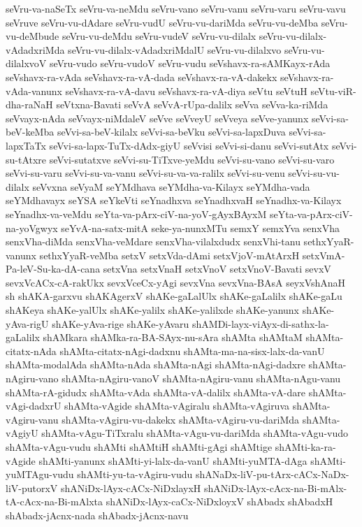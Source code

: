 {seVru-va-naSeTx
seVru-va-neMdu
seVru-vano
seVru-vanu
seVru-varu
seVru-vavu
seVruve
seVru-vu-dAdare
seVru-vudU
seVru-vu-dariMda
seVru-vu-deMba
seVru-vu-deMbude
seVru-vu-deMdu
seVru-vudeV
seVru-vu-dilalx
seVru-vu-dilalx-vAdadxriMda
seVru-vu-dilalx-vAdadxriMdalU
seVru-vu-dilalxvo
seVru-vu-dilalxvoV
seVru-vudo
seVru-vudoV
seVru-vudu
seVshavx-ra-sAMKayx-rAda
seVshavx-ra-vAda
seVshavx-ra-vA-dada
seVshavx-ra-vA-dakekx
seVshavx-ra-vAda-vanunx
seVshavx-ra-vA-davu
seVshavx-ra-vA-diya
seVtu
seVtuH
seVtu-viR-dha-raNaH
seVtxna-Bavati
seVvA
seVvA-rUpa-dalilx
seVva
seVva-ka-riMda
seVvayx-nAda
seVvayx-niMdaleV
seVve
seVveyU
seVveya
seVve-yanunx
seVvi-sa-beV-keMba
seVvi-sa-beV-kilalx
seVvi-sa-beVku
seVvi-sa-lapxDuva
seVvi-sa-lapxTaTx
seVvi-sa-lapx-TuTx-dAdx-giyU
seVvisi
seVvi-si-danu
seVvi-sutAtx
seVvi-su-tAtxre
seVvi-sutatxve
seVvi-su-TiTxve-yeMdu
seVvi-su-vano
seVvi-su-varo
seVvi-su-varu
seVvi-su-va-vanu
seVvi-su-va-va-ralilx
seVvi-su-venu
seVvi-su-vu-dilalx
seVvxna
seVyaM
seYMdhava
seYMdha-va-Kilayx
seYMdha-vada
seYMdhavayx
seYSA
seYkeVti
seYnadhxva
seYnadhxvaH
seYnadhx-va-Kilayx
seYnadhx-va-veMdu
seYta-va-pArx-ciV-na-yoV-gAyxBAyxM
seYta-va-pArx-ciV-na-yoVgwyx
seYvA-na-satx-mitA
seke-ya-nunxMTu
semxY
semxYva
senxVha
senxVha-diMda
senxVha-veMdare
senxVha-vilalxdudx
senxVhi-tanu
sethxYyaR-vanunx
sethxYyaR-veMba
setxV
setxVda-dAmi
setxVjoV-mAtArxH
setxVmA-Pa-leV-Su-ka-dA-cana
setxVna
setxVnaH
setxVnoV
setxVnoV-Bavati
sevxV
sevxVcACx-cA-rakUkx
sevxVceCx-yAgi
sevxVna
sevxVna-BAsA
seyxVshAnaH
sh
shAKA-garxvu
shAKAgerxV
shAKe-gaLalUlx
shAKe-gaLalilx
shAKe-gaLu
shAKeya
shAKe-yalUlx
shAKe-yalilx
shAKe-yalilxde
shAKe-yanunx
shAKe-yAva-rigU
shAKe-yAva-rige
shAKe-yAvaru
shAMDi-layx-viAyx-di-sathx-la-gaLalilx
shAMkara
shAMka-ra-BA-SAyx-nu-sAra
shAMta
shAMtaM
shAMta-citatx-nAda
shAMta-citatx-nAgi-dadxnu
shAMta-ma-na-sisx-lalx-da-vanU
shAMta-modalAda
shAMta-nAda
shAMta-nAgi
shAMta-nAgi-dadxre
shAMta-nAgiru-vano
shAMta-nAgiru-vanoV
shAMta-nAgiru-vanu
shAMta-nAgu-vanu
shAMta-rA-gidudx
shAMta-vAda
shAMta-vA-dalilx
shAMta-vA-dare
shAMta-vAgi-dadxrU
shAMta-vAgide
shAMta-vAgiralu
shAMta-vAgiruva
shAMta-vAgiru-vanu
shAMta-vAgiru-vu-dakekx
shAMta-vAgiru-vu-dariMda
shAMta-vAgiyU
shAMta-vAgu-TiTxralu
shAMta-vAgu-vu-dariMda
shAMta-vAgu-vudo
shAMta-vAgu-vudu
shAMti
shAMtiH
shAMti-gAgi
shAMtige
shAMti-ka-ra-vAgide
shAMti-yanunx
shAMti-yi-lalx-da-vanU
shAMti-yuMTA-dAga
shAMti-yuMTAgu-vudu
shAMti-yu-ta-vAgiru-vudu
shANaDx-liV-pu-tArx-cACx-NaDx-liV-putorxV
shANiDx-lAyx-cACx-NiDxlayxH
shANiDx-lAyx-cAcx-na-Bi-mAlx-tA-cAcx-na-Bi-mAlxta
shANiDx-lAyx-caCx-NiDxloyxV
shAbadx
shAbadxH
shAbadx-jAcnx-nada
shAbadx-jAcnx-navu
}
